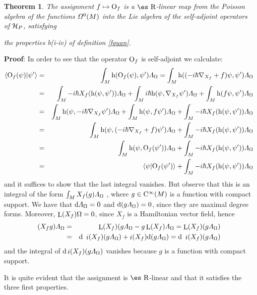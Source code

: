 \documentclass[12pt]{article}
\theoremstyle{plain}
\newtheorem{teor}{Theorem}
\def\beann{\begin{eqnarray*}}
\def\eeann{\end{eqnarray*}}
\def\dst{\(}
\def\d{{\rm d}}
\def\H{{\cal H}}
\def\Op{{\rm O}}
\def\h{{\rm h}}
\def\Real{\mbox{\es R}}
\def\inn{\mathop{i}\nolimits}
\def\Lie{\mathop{\rm L}\nolimits}
\def\Cinfty{{\rm C}^\infty}
\def\LF{{\mit\Lambda}_{\Omega}}
\begin{document}
\begin{teor}
The assignment $f \mapsto \Op_f$ is a $\Real$-linear map from
the Poisson algebra of the functions ${\mit\Omega}^0(M)$
into the Lie algebra of the self-adjoint operators of $\H_P$, satisfying

the properties
b(i-iv) of definition \ref{fquan}.
\label{prop}
\end{teor}
{\bf Proof}: 
In order to see that the operator $\Op_f$ is self-adjoint we calculate:
\beann
\langle \Op_f(\psi ) | \psi' \rangle
&=&
\int_M \h (\Op_f(\psi ),\psi') \LF
=
\int_M \h ((-i\hbar\nabla_{X_f}+f)\psi ,\psi ') \LF
\\
&=&
\int_M -i\hbar X_f(\h (\psi ,\psi ')) \LF
+ \int_M i\hbar \h (\psi ,\nabla_{X_f}\psi ') \LF
+ \int_M \h (f\psi ,\psi ') \LF
\\
&=&
\int_M \h (\psi ,-i\hbar\nabla_{X_f}\psi ') \LF
+ \int_M \h (\psi ,f\psi ') \LF
+ \int_M -i\hbar X_f( \h (\psi ,\psi ')) \LF
\\
&=&
\int_M \h (\psi ,(-i\hbar\nabla_{X_f}+f)\psi ') \LF
+ \int_M -i\hbar X_f(\h (\psi ,\psi ')) \LF
\\
&=&
\int_M \h (\psi ,\Op_f(\psi ')) \LF
+ \int_M -i\hbar X_f(\h (\psi ,\psi ')) \LF \\
&=&
\langle \psi | \Op_f(\psi ') \rangle
+ \int_M -i\hbar X_f(\h (\psi ,\psi ')) \LF
\eeann
and it suffices to show that the last integral vanishes.
But observe that  this is an integral of the form
\dst\int_M X_f(g) \LF\) , where
$g \in \Cinfty(M)$ is a function with compact support.
We have that $\d \LF = 0$ and $\d (g\LF ) = 0$,
since they are maximal degree forms.
Moreover, $\Lie(X_f)\Omega=0$, since $X_f$ is a Hamiltonian vector
field, hence
\beann
(X_fg) \LF
&=&
\Lie(X_f)(g\LF - g\Lie(X_f)\LF =\Lie(X_f)(g\LF )
\\ &=&
\d \ \inn(X_f)(g\LF )+ \inn(X_f)\d (g\LF )
=\d \ \inn(X_f)(g\LF )
\eeann
and the integral of
$\d\inn(X_f)(g\LF )$
vanishes because $g$ is a function with compact support.

It is quite evident that the assignment is $\Real$-linear and that it
satisfies the
three first properties.
\end{document}
